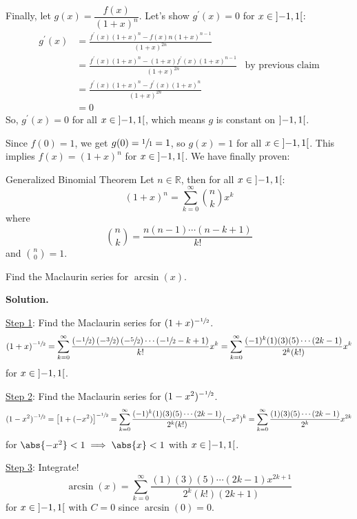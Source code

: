 Finally, let $ g(x)=\dfrac{f(x)}{(1+x)^n} $. Let's show $ g^\prime(x)=0 $
for $ x\in\interval[open]{-1}{1} $:
\begin{align*}
    g^\prime(x)
     & =\frac{f^\prime(x)(1+x)^n-f(x)n(1+x)^{n-1}}{(1+x)^{2n}}                                       \\
     & =\frac{f^\prime(x)(1+x)^n-(1+x)f^\prime(x)(1+x)^{n-1}}{(1+x)^{2n}} & \text{by previous claim} \\
     & =\frac{f^\prime(x)(1+x)^{n}-f^\prime(x)(1+x)^n}{(1+x)^{2n}}                                   \\
     & =0
\end{align*}
So, $ g^\prime(x)=0 $ for all $ x\in\interval[open]{-1}{1} $, which means
$ g $ is constant on $ \interval[open]{-1}{1} $.

Since $ f(0)=1 $, we get $ g(0)=\sfrac{1}{1} =1 $, so $ g(x)=1 $
for all $ x\in\interval[open]{-1}{1} $. This implies
$ f(x)=(1+x)^n $ for $ x\in\interval[open]{-1}{1} $. We have finally proven:

\begin{Theorem}{Generalized Binomial Theorem}{}
    Let $ n\in\mathbb{R} $, then for all $ x\in\interval[open]{-1}{1} $:
    \[ (1+x)^n=
        \sum\limits_{k=0}^{\infty} \binom{n}{k}x^k \]
    where
    \[ \binom{n}{k}=\frac{n(n-1)\cdots(n-k+1)}{k!} \]
    and $ \binom{n}{0}=1 $.
\end{Theorem}

\begin{Example}{}{}
    Find the Maclaurin series for $ \arcsin(x) $.

    \textbf{Solution.}

    \underline{Step 1}: Find the Maclaurin series for $ (1+x)^{-\sfrac{1}{2}} $.
    \[ (1+x)^{-\sfrac{1}{2}}
        =\sum\limits_{k=0}^{\infty} \frac{\left( -\sfrac{1}{2} \right)\left( -\sfrac{3}{2}  \right)
            \left( -\sfrac{5}{2} \right)\cdots\left( -\sfrac{1}{2} -k +1\right)}{k!}x^k
        =\sum\limits_{k=0}^{\infty} \frac{(-1)^k(1)(3)(5)\cdots(2k-1)}{2^k (k!)}x^k   \]
    for $ x\in\interval[open]{-1}{1} $.

    \underline{Step 2}: Find the Maclaurin series for $ (1-x^2)^{-\sfrac{1}{2} } $.
    \[ (1-x^2)^{-\sfrac{1}{2}}
        =\left[ 1+(-x^2) \right]^{-\sfrac{1}{2}}
        =\sum\limits_{k=0}^{\infty} \frac{(-1)^k(1)(3)(5)\cdots(2k-1)}{2^k (k!)}(-x^2)^k
        =\sum\limits_{k=0}^{\infty} \frac{(1)(3)(5)\cdots(2k-1)}{2^k}x^{2k}  \]
    for $ \abs{-x^2}<1\implies\abs{x}<1 $ with $ x\in\interval[open]{-1}{1} $.

    \underline{Step 3}: Integrate!
    \[ \arcsin(x)
        =\sum\limits_{k=0}^{\infty}\frac{(1)(3)(5)\cdots(2k-1)x^{2k+1}}{2^k(k!)(2k+1)}   \]
    for $ x\in\interval[open]{-1}{1} $ with $ C=0 $ since $ \arcsin(0)=0 $.
\end{Example}

